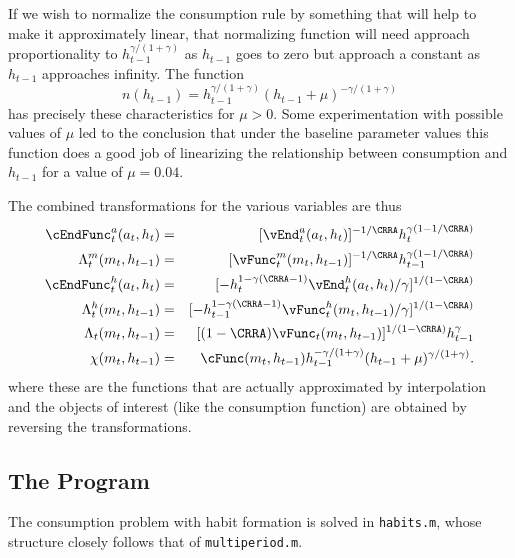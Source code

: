 \documentclass[titlepage]{\econtex}
\begin{document}
{  If we wish to normalize the consumption rule by something that will
  help to make it approximately linear, that normalizing function will
  need approach proportionality to $h_{t-1}^{\gamma/(1+\gamma)}$ as
  $h_{t-1}$ goes to zero but approach a constant as $h_{t-1}$ approaches
  infinity.  The function
  \begin{equation}
    n(h_{t-1}) =
    h_{t-1}^{\gamma/(1+\gamma)}(h_{t-1}+\mu)^{-\gamma/(1+\gamma)}
  \end{equation}
  has precisely these characteristics for $\mu>0$.  Some
  experimentation with possible values of $\mu$ led to the conclusion
  that under the baseline parameter values this function does a good job
  of linearizing the relationship between consumption and $h_{t-1}$ for
  a value of $\mu = 0.04$.

  The combined transformations for the various variables are thus
  \begin{eqnarray}
    \cEndFunc_{t}^{{a}}({a}_{t},h_{t})       & = & [\vEnd_{t}^{{a}}({a}_{t},h_{t})]^{-1/\CRRA} h_{t}^{\gamma(1-1/\CRRA)} \label{eq:vEndstransform} \\
    \Lambda_{t}^{m}({m}_{t},h_{t-1})  & = & [{\vFunc}_{t}^{m}({m}_{t},h_{t-1})]^{-1/\CRRA} h_{t-1}^{\gamma(1-1/\CRRA)} \label{eq:vxtransform} \\
    \cEndFunc_{t}^{h}({a}_{t},h_{t})       & = &
                                                 [-h_{t}^{1-\gamma(\CRRA-1)}\vEnd_{t}^{h}({a}_{t},h_{t})/\gamma]^{1/(1-\CRRA)}  \label{eq:vEndhtransform}
    \\      \Lambda_{t}^{h}({m}_{t},h_{t-1})  & = & [-h_{t-1}^{1-\gamma(\CRRA-1)}{\vFunc}_{t}^{h}({m}_{t},h_{t-1})/\gamma]^{1/(1-\CRRA)} \label{eq:vhtransform}
    \\      \Lambda_{t}({m}_{t},h_{t-1})      & = & [(1-\CRRA)
                                                    {\vFunc}_{t}({m}_{t},h_{t-1})]^{1/(1-\CRRA)} h_{t-1}^{\gamma}\label{eq:vtransform}
    \\  \chi({m}_{t},h_{t-1})      & = & \cFunc({m}_{t},h_{t-1})h_{t-1}^{-\gamma/(1+\gamma)}(h_{t-1}+\mu)^{\gamma/(1+\gamma)}.
  \end{eqnarray}
  where these are the functions that are actually approximated by
  interpolation and the objects of interest (like the consumption
  function) are obtained by reversing the transformations.

  \hypertarget{The-Program}{}
  \subsection{The Program}
  The consumption problem with habit formation is solved in
  \texttt{habits.m}, whose structure closely follows that of
  \texttt{multiperiod.m}.

}
\end{document}
